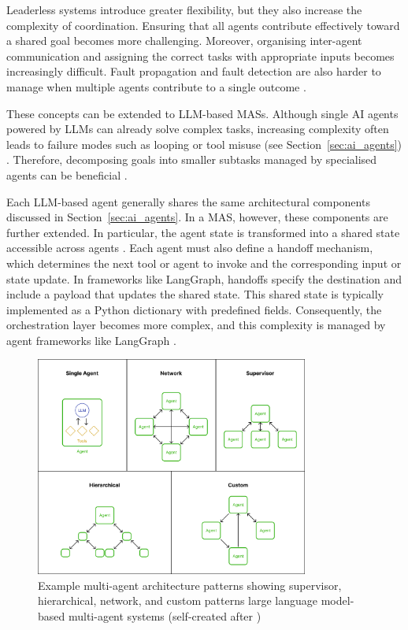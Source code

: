 \documentclass[a4paper,oneside,bibliography=totoc]{scrbook}
\begin{document}
Leaderless systems introduce greater flexibility, but they also increase the complexity of coordination. Ensuring that all agents contribute effectively toward a shared goal becomes more challenging. Moreover, organising inter-agent communication and assigning the correct tasks with appropriate inputs becomes increasingly difficult. Fault propagation and fault detection are also harder to manage when multiple agents contribute to a single outcome \cite{Dorri2018}.

These concepts can be extended to \ac{LLM}-based \acp{MAS}. Although single \ac{AI} agents powered by \acp{LLM} can already solve complex tasks, increasing complexity often leads to failure modes such as looping or tool misuse (see Section~\ref{sec:ai_agents}) \cite{OpenAI2025}. Therefore, decomposing goals into smaller subtasks managed by specialised agents can be beneficial \cite{Sapkota2025}.

Each \ac{LLM}-based agent generally shares the same architectural components discussed in Section~\ref{sec:ai_agents}. In a \ac{MAS}, however, these components are further extended. In particular, the agent state is transformed into a shared state accessible across agents \cite{Sapkota2025}. Each agent must also define a handoff mechanism, which determines the next tool or agent to invoke and the corresponding input or state update. In frameworks like LangGraph, handoffs specify the destination and include a payload that updates the shared state. This shared state is typically implemented as a Python dictionary with predefined fields. Consequently, the orchestration layer becomes more complex, and this complexity is managed by agent frameworks like LangGraph \cite{LangChain2025b}.

\begin{figure}[t]
  \centering
  \includegraphics[width=0.8\textwidth]{figures/Multi-agent architectures.png}
  \caption[Example multi-agent architecture patterns showing supervisor, hierarchical, network, and custom patterns for large language model-based multi-agent systems]{Example multi-agent architecture patterns showing supervisor, hierarchical, network, and custom patterns large language model-based multi-agent systems (self-created after \cite{LangChain2025b})}
  \label{fig:mas_architecture}
\end{figure}
\end{document}
